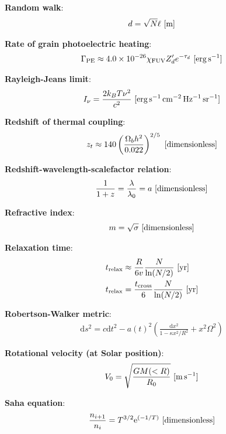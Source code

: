 \documentclass[a4paper,10pt]{article}
\begin{document}
{\noindent}\textbf{Random walk}:
\begin{align*}
    d = \sqrt{N}\ell ~ [{\rm m}]
\end{align*}

{\noindent}\textbf{Rate of grain photoelectric heating}:
\begin{align*}
    \Gamma_{\rm PE} \approx 4.0\times10^{-26}\chi_{\rm FUV}Z_d'e^{-\tau_d} ~ [{\rm erg\,s^{-1}}]
\end{align*}

{\noindent}\textbf{Rayleigh-Jeans limit}:
\begin{align*}
    I_\nu = \frac{2k_BT\nu^2}{c^2} ~ [{\rm erg\,s^{-1}\,cm^{-2}\,Hz^{-1}\,sr^{-1}}]
\end{align*}

{\noindent}\textbf{Redshift of thermal coupling}:
\begin{align*}
    z_t \approx 140\left(\frac{\Omega_bh^2}{0.022}\right)^{2/5} ~ [{\rm dimensionless}]
\end{align*}

{\noindent}\textbf{Redshift-wavelength-scalefactor relation}:
\begin{align*}
    \frac{1}{1+z} = \frac{\lambda}{\lambda_0} = a ~ [{\rm dimensionless}]
\end{align*}

{\noindent}\textbf{Refractive index}:
\begin{align*}
    m=\sqrt{\sigma} ~ [{\rm dimensionless}]
\end{align*}

{\noindent}\textbf{Relaxation time}:
\begin{align*}
    t_\mathrm{relax} &\approx \frac{R}{6v} \frac{N}{\ln(N/2)} ~ [{\rm yr}] \\
    t_\mathrm{relax} &= \frac{t_\mathrm{cross}}{6} \frac{N}{\ln(N/2)} ~ [{\rm yr}]
\end{align*}

{\noindent}\textbf{Robertson-Walker metric}:
\begin{align*}
    \mathrm{d}s^2 = c\mathrm{d}t^2 -a(t)^2 \left( \frac{\mathrm{d}x^2}{1-\kappa x^2/R^2} + x^2\Omega^2 \right)
\end{align*}

{\noindent}\textbf{Rotational velocity (at Solar position)}:
\begin{align*}
    V_0 = \sqrt{\frac{GM(<R)}{R_0}} ~ [{\rm m\,s^{-1}}]
\end{align*}

{\noindent}\textbf{Saha equation}:
\begin{align*}
    \frac{n_{i+1}}{n_i} = T^{3/2}\mathrm{e}^{(-1/T)} ~ [{\rm dimensionless}]
\end{align*}
\end{document}
